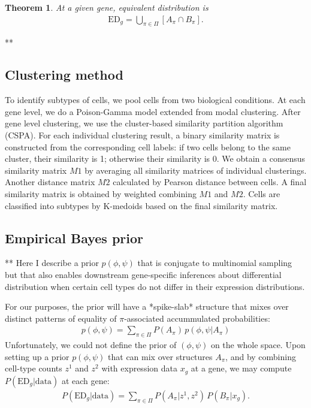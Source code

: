 \documentclass[11pt]{amsart}
\newtheorem{theorem}{Theorem}
\begin{document}
\begin{theorem}  At a given gene, equivalent distribution is
\begin{eqnarray*}
\text{ED}_g = \bigcup_{\pi \in \Pi}\left[ A_\pi \cap B_\pi \right].
\end{eqnarray*}
\end{theorem}


**
\subsection{Clustering method}
To identify subtypes of cells, we pool cells from two biological conditions. At each gene level, we do a Poison-Gamma model extended from modal clustering\cite{ref:dahl}. After gene level clustering, we use the cluster-based similarity partition algorithm (CSPA\cite{ref:cspa}). For each individual clustering result, a binary similarity matrix is constructed from the corresponding cell labels: if two cells belong to the same cluster, their similarity is 1; otherwise their similarity is 0. We obtain a consensus similarity matrix $M1$ by averaging all similarity matrices of individual clusterings. Another distance matrix $M2$ calculated by Pearson distance between cells. A final similarity matrix is obtained by weighted combining $M1$ and $M2$. Cells are classified into subtypes by K-medoids based on the final similarity matrix.



\subsection{Empirical Bayes prior}

**
Here I describe a prior $p(\phi,\psi)$ that is conjugate to multinomial
sampling but that also enables downstream gene-specific inferences about
differential distribution when certain 
cell types do not differ in their expression
distributions.  


For our purposes, the prior will have a *spike-slab* structure that mixes
over distinct patterns of equality of $\pi$-associated
accummulated probabilities:
\begin{eqnarray*}
p(\phi,\psi) = \sum_{\pi \in \Pi} P(A_\pi) \, p(\phi,\psi| A_\pi )
\end{eqnarray*}
Unfortunately, we could not define the prior of $(\phi,\psi)$ on the whole space. 
Upon setting up a prior $p(\phi,\psi)$ that can mix over structures
$A_\pi$, and by combining cell-type counts $z^1$ and $z^2$ with
expression data $x_g$ at a gene, we may compute 
$P(\text{ED}_g|\text{data})$ 
at each gene:
\begin{align}
P(\text{ED}_g|\text{data}) = \sum_{\pi \in \Pi} P(A_\pi|z^1, z^2) \, 
P(B_\pi|x_g).
\end{align}
\end{document}
